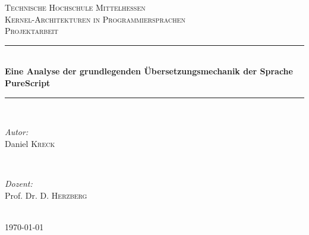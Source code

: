 \documentclass[
12pt,
ngerman,
oneside]
{scrbook} %
\begin{document}
	

\begin{titlepage}
	
	\newcommand{\HRule}{\rule{\linewidth}{0.5mm}} %
	
	\center %
	
	\textsc{\LARGE Technische Hochschule Mittelhessen}\\[1.5cm] %
	\textsc{\Large Kernel-Architekturen in Programmiersprachen}\\[0.5cm] %
	\textsc{\large Projektarbeit}\\[0.5cm] %
	
	\HRule \\[0.7cm]
	{ \huge \bfseries Eine Analyse der grundlegenden Übersetzungsmechanik der Sprache PureScript}\\[0.4cm] %
	\HRule \\[1.5cm]
	
	\begin{minipage}{0.4\textwidth}
		\begin{flushleft} \large
			\emph{Autor:}\\
			Daniel \textsc{Kreck} %
		\end{flushleft}
	\end{minipage}
	~
	\begin{minipage}{0.4\textwidth}
		\begin{flushright} \large
			\emph{Dozent:} \\
			Prof. Dr. D. \textsc{Herzberg} %
		\end{flushright}
	\end{minipage}\\[4cm]
	
	{\large \today}\\[3cm] %
	
	
	\vfill %
	
\end{titlepage}
\end{document}
